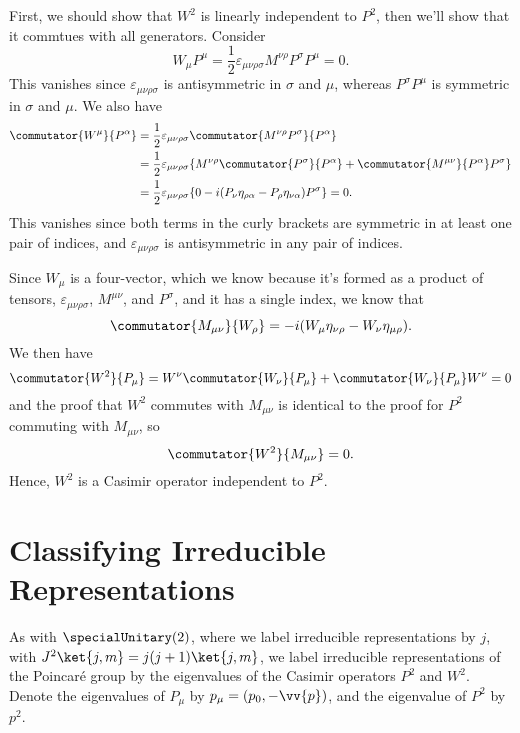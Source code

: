 \documentclass[fleqn]{NotesClass}
\newcommand{\minkowskiMetric}{\eta}
\begin{document}
    First, we should show that \(W^2\) is linearly independent to \(P^2\), then we'll show that it commtues with all generators.
    Consider
    \begin{equation}
        W_\mu P^\mu = \frac{1}{2}\varepsilon_{\mu\nu\rho\sigma} M^{\nu\rho} P^\sigma P^\mu = 0.
    \end{equation}
    This vanishes since \(\varepsilon_{\mu\nu\rho\sigma}\) is antisymmetric in \(\sigma\) and \(\mu\), whereas \(P^\sigma P^\mu\) is symmetric in \(\sigma\) and \(\mu\).
    We also have
    \begin{align}
        \commutator{W^\mu}{P^\alpha} &= \frac{1}{2}\varepsilon_{\mu\nu\rho\sigma}\commutator{M^{\nu\rho}P^\sigma}{P^\alpha}\\
        &= \frac{1}{2}\varepsilon_{\mu\nu\rho\sigma}\{M^{\nu\rho}\commutator{P^\sigma}{P^\alpha} + \commutator{M^{\mu\nu}}{P^\alpha}P^\sigma\}\\
        &= \frac{1}{2}\varepsilon_{\mu\nu\rho\sigma}\{0 - i(P_\nu \minkowskiMetric_{\rho\alpha} - P_\rho \minkowskiMetric_{\nu\alpha})P^\sigma\}
        = 0.
    \end{align}
    This vanishes since both terms in the curly brackets are symmetric in at least one pair of indices, and \(\varepsilon_{\mu\nu\rho\sigma}\) is antisymmetric in any pair of indices.
    
    Since \(W_\mu\) is a four-vector, which we know because it's formed as a product of tensors, \(\varepsilon_{\mu\nu\rho\sigma}\), \(M^{\mu\nu}\), and \(P^\sigma\), and it has a single index, we know that
    \begin{equation}
        \commutator{M_{\mu\nu}}{W_\rho} = -i(W_\mu \minkowskiMetric_{\nu\rho} - W_\nu \minkowskiMetric_{\mu\rho}).
    \end{equation}
    We then have
    \begin{equation}
        \commutator{W^2}{P_\mu} = W^\nu\commutator{W_\nu}{P_\mu} + \commutator{W_\nu}{P_\mu}W^\nu = 0
    \end{equation}
    and the proof that \(W^2\) commutes with \(M_{\mu\nu}\) is identical to the proof for \(P^2\) commuting with \(M_{\mu\nu}\), so
    \begin{equation}
        \commutator{W^2}{M_{\mu\nu}} = 0.
    \end{equation}
    Hence, \(W^2\) is a Casimir operator independent to \(P^2\).
    
    \section{Classifying Irreducible Representations}
    As with \(\specialUnitary(2)\), where we label irreducible representations by \(j\), with \(J^2 \ket{j, m} = j(j + 1)\ket{j, m}\), we label irreducible representations of the Poincar\'e group by the eigenvalues of the Casimir operators \(P^2\) and \(W^2\).
    Denote the eigenvalues of \(P_\mu\) by \(p_\mu = (p_0, -\vv{p})\), and the eigenvalue of \(P^2\) by \(p^2\).
    
\end{document}
